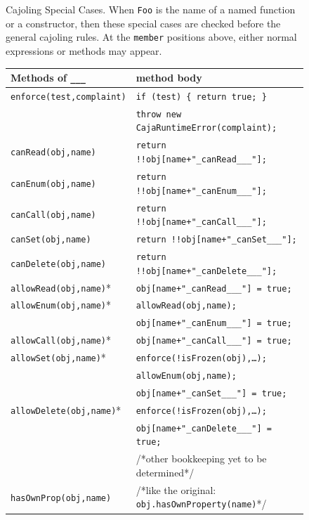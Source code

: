 \documentclass[letterpaper,twocolumn,10pt]{article}
\newcommand{\code}[1]{{\tt {#1}}}              %
\begin{document}
\begin{figure}
\caption[Cajoling Special Cases]{Cajoling Special Cases. When \code{Foo} is 
the name of a named function or a constructor, then these special cases are 
checked before the general cajoling rules. At the \code{member} positions 
above, either normal expressions or methods may appear.}
\label{tab:special-cases}
\end{figure}


\begin{figure}
\begin{tabular}{ll}
  Methods of \code{\_\_\_}  & method body \\ 
  \hline 
  \code{enforce(test,complaint)}
       & \code{if (test)\ \{ return true; \}} \\
       & \code{throw new CajaRuntimeError(complaint);} \\
  \hline
  \code{canRead(obj,name)}  
       & \code{return !!obj[name+"\_canRead\_\_\_"];} \\
  \code{canEnum(obj,name)}
       & \code{return !!obj[name+"\_canEnum\_\_\_"];} \\
  \code{canCall(obj,name)}
       & \code{return !!obj[name+"\_canCall\_\_\_"];} \\
  \code{canSet(obj,name)}
       & \code{return !!obj[name+"\_canSet\_\_\_"];} \\
  \code{canDelete(obj,name)}
       & \code{return !!obj[name+"\_canDelete\_\_\_"];} \\
  \hline
  \code{allowRead(obj,name)}* 
       & \code{obj[name+"\_canRead\_\_\_"] = true;} \\
  \code{allowEnum(obj,name)}* 
       & \code{allowRead(obj,name);} \\
       & \code{obj[name+"\_canEnum\_\_\_"] = true;} \\
  \code{allowCall(obj,name)}* 
       & \code{obj[name+"\_canCall\_\_\_"] = true;} \\
  \code{allowSet(obj,name)}* 
       & \code{enforce(!isFrozen(obj),\ldots);} \\
       & \code{allowEnum(obj,name);} \\
       & \code{obj[name+"\_canSet\_\_\_"] = true;}\\
  \code{allowDelete(obj,name)}* 
       & \code{enforce(!isFrozen(obj),\ldots);} \\
       & \code{obj[name+"\_canDelete\_\_\_"] = true;} \\
       & /*other bookkeeping yet to be determined*/ \\
  \hline
  \code{hasOwnProp(obj,name)} 
       & /*like the original: \code{obj.hasOwnProperty(name)}*/ \\

\end{tabular}
\end{figure}
\end{document}
